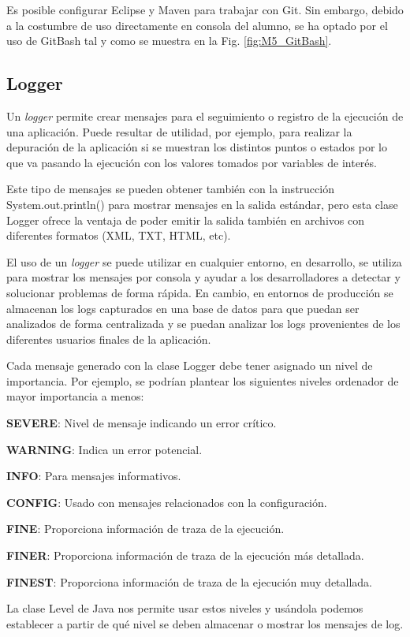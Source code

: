 
Es posible configurar Eclipse y Maven para trabajar con Git. Sin embargo, debido a la costumbre de uso directamente en consola del alumno, se ha optado por el uso de GitBash tal y como se muestra en la Fig. \ref{fig:M5_GitBash}.


\subsection{Logger}


Un \textit{logger} permite crear mensajes para el seguimiento o registro de la ejecución de una aplicación. Puede resultar de utilidad, por ejemplo, para realizar la depuración de la aplicación si se muestran los distintos puntos o estados por lo que va pasando la ejecución con los valores tomados por variables de interés\cite{logger_info}.

Este tipo de mensajes se pueden obtener también con la instrucción System.out.println() para mostrar mensajes en la salida estándar, pero esta clase Logger ofrece la ventaja de poder emitir la salida también en archivos con diferentes formatos (XML, TXT, HTML, etc).

El uso de un \textit{logger} se puede utilizar en cualquier entorno, en desarrollo, se utiliza para mostrar los mensajes por consola y ayudar a los desarrolladores a detectar y solucionar problemas de forma rápida. En cambio, en entornos de producción se almacenan los logs capturados en una base de datos para que puedan ser analizados de forma centralizada y se puedan analizar los logs provenientes de los diferentes usuarios finales de la aplicación.


Cada mensaje generado con la clase Logger debe tener asignado un nivel de importancia. Por ejemplo, se podrían plantear los siguientes niveles ordenador de mayor importancia a menos\cite{Level_class_info}:
\begin{description}
\item \textbf{SEVERE}: Nivel de mensaje indicando un error crítico.
\item \textbf{WARNING}: Indica un error potencial.
\item \textbf{INFO}: Para mensajes informativos.
\item \textbf{CONFIG}: Usado con mensajes relacionados con la configuración.
\item \textbf{FINE}: Proporciona información de traza de la ejecución.
\item \textbf{FINER}: Proporciona información de traza de la ejecución más detallada.
\item \textbf{FINEST}: Proporciona información de traza de la ejecución muy detallada.

La clase Level de Java nos permite usar estos niveles y usándola podemos establecer a partir de qué nivel se deben almacenar o mostrar los mensajes de log.

\end{description}

